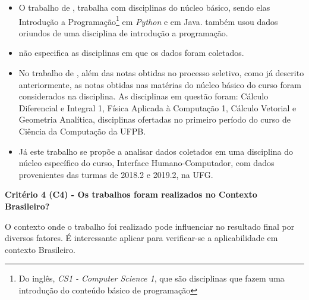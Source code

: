 \begin{itemize}
    \item O trabalho de , trabalha com disciplinas do núcleo básico, sendo elas Introdução a Programação\footnote[4]{Do inglês, \textit{CS1 - Computer Science 1}, que são disciplinas que fazem uma introdução do conteúdo básico de programação} em \textit{Python} e em Java.  também usou dados oriundos de uma disciplina de introdução a programação.
    \item {} não especifica as disciplinas em que os dados foram coletados.
    \item No trabalho de , além das notas obtidas no processo seletivo, como já descrito anteriormente, as notas obtidas nas matérias do núcleo básico do curso foram considerados na disciplina. As disciplinas em questão foram: Cálculo Diferencial e Integral 1, Física Aplicada à Computação 1, Cálculo Vetorial e Geometria Analítica, disciplinas ofertadas no primeiro período do curso de Ciência da Computação da UFPB.
    \item Já este trabalho se propõe a analisar dados coletados em uma disciplina do núcleo específico do curso, Interface Humano-Computador, com dados provenientes das turmas de 2018.2 e 2019.2, na UFG.
\end{itemize}

\textbf{Critério 4 (C4) - Os trabalhos foram realizados no Contexto Brasileiro?}

O contexto onde o trabalho foi realizado pode influenciar no resultado final por diversos fatores. É interessante aplicar para verificar-se a aplicabilidade em contexto Brasileiro.

